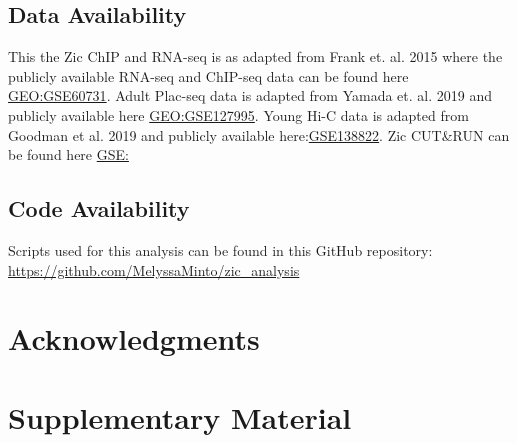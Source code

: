 \documentclass[fleqn,10pt]{wlscirep}
\begin{document}
\subsection*{Data Availability}
This the Zic ChIP and RNA-seq is as adapted from Frank et. al. 2015 \cite{Frank2015RegulationCerebellum} where the publicly available RNA-seq and ChIP-seq  data can be found here \href{https://www.ncbi.nlm.nih.gov/geo/query/acc.cgi?acc=GSE60731}{GEO:GSE60731}. Adult Plac-seq data is adapted from Yamada et. al. 2019 \cite{Yamada2019SensoryLearning} and publicly available here \href{https://www.ncbi.nlm.nih.gov/geo/query/acc.cgi?acc=GSE127995}{GEO:GSE127995}. Young Hi-C data is adapted from Goodman et al. 2019 \cite{Goodman2020TheBrain} and publicly available here:\href{https://www.ncbi.nlm.nih.gov/geo/query/acc.cgi?acc=GSE138822}{GSE138822}. Zic CUT&RUN can be found here \href{}{GSE:}

\subsection*{Code Availability}
Scripts used for this analysis can be found in this GitHub repository: \href{https://github.com/MelyssaMinto/zic_analysis}{https://github.com/MelyssaMinto/zic_analysis}

\section*{Acknowledgments}

\clearpage


\clearpage


\beginsupplement
\section*{Supplementary Material}
\end{document}
